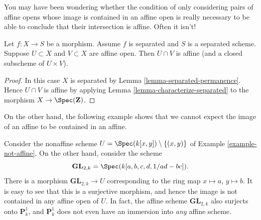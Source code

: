 \noindent
You may have been wondering whether the condition
of only considering pairs of affine opens whose image is contained
in an affine open is really necessary to be able to conclude
that their intersection is affine. Often it isn't!

\begin{lemma}
\label{lemma-curiosity}
Let $f : X \to S$ be a morphism.
Assume $f$ is separated and $S$ is a separated scheme.
Suppose $U \subset X$ and $V \subset X$ are affine open.
Then $U \cap V$ is affine (and a closed subscheme of $U \times V$).
\end{lemma}

\begin{proof}
In this case $X$ is separated by Lemma \ref{lemma-separated-permanence}.
Hence $U \cap V$ is affine by
applying Lemma \ref{lemma-characterize-separated} to the
morphism $X \to \Spec(\mathbf{Z})$.
\end{proof}

\noindent
On the other hand, the following example shows that we cannot
expect the image of an affine to be contained in an affine.

\begin{example}
\label{example-image-affine-projective}
Consider the nonaffine scheme
$U = \Spec(k[x, y]) \setminus \{(x, y)\}$ of
Example \ref{example-not-affine}. On the other hand, consider the
scheme
$$
\mathbf{GL}_{2, k} = \Spec(k[a, b, c, d, 1/ad - bc]).
$$
There is a morphism $\mathbf{GL}_{2, k} \to U$ corresponding
to the ring map $x \mapsto a$, $y \mapsto b$. It is easy to see that
this is a surjective morphism, and hence the image is not contained
in any affine open of $U$. In fact, the affine scheme
$\mathbf{GL}_{2, k}$ also surjects onto $\mathbf{P}^1_k$, and
$\mathbf{P}^1_k$ does not even have an immersion into {\it any} affine scheme.
\end{example}

